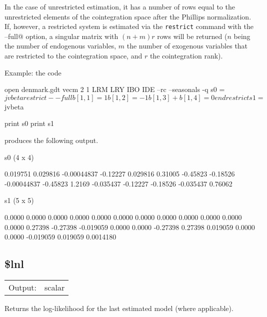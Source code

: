 	  In the case of unrestricted estimation, it has a number of rows
	  equal to the unrestricted elements of the cointegration space
	  after the Phillips normalization. If, however, a restricted
	  system is estimated via the \texttt{restrict} command with the
	  \verb@--full@ option, a singular matrix with \ensuremath{(n+m)r}
	  rows will be returned (\ensuremath{n} being the number of
	  endogenous variables, \ensuremath{m} the number of exogenous
          variables that are restricted to the cointegration space,
          and \ensuremath{r} the cointegration rank).

	  Example: the code

\begin{code}
	  open denmark.gdt
	  vecm 2 1 LRM LRY IBO IDE --rc --seasonals -q
	  s0 = $jvbeta

	  restrict --full
	  b[1,1] = 1
	  b[1,2] = -1
	  b[1,3] + b[1,4] = 0
	  end restrict
	  s1 = $jvbeta

	  print s0
	  print s1

\end{code}

	  produces the following output.

\begin{code}
	  s0 (4 x 4)

	    0.019751     0.029816  -0.00044837     -0.12227 
	    0.029816      0.31005     -0.45823     -0.18526 
	 -0.00044837     -0.45823       1.2169    -0.035437 
	    -0.12227     -0.18526    -0.035437      0.76062 

	  s1 (5 x 5)

	  0.0000       0.0000       0.0000       0.0000       0.0000 
	  0.0000       0.0000       0.0000       0.0000       0.0000 
	  0.0000       0.0000      0.27398     -0.27398    -0.019059 
	  0.0000       0.0000     -0.27398      0.27398     0.019059 
	  0.0000       0.0000    -0.019059     0.019059    0.0014180 

\end{code}

\subsection{\$lnl}
\hypertarget{func-dollnl}{}

\begin{tabular}{ll}
Output:     & scalar\\
\end{tabular}

	  Returns the log-likelihood for the last estimated model (where
	  applicable).

